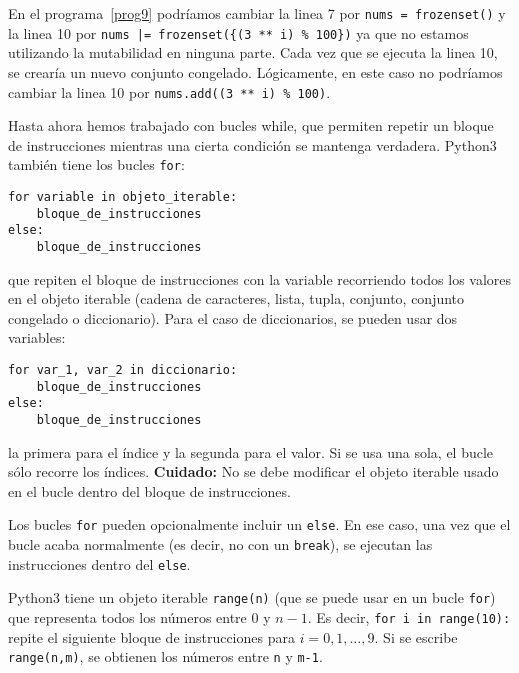 \documentclass[a4paper, 11pt]{article}
\theoremstyle{plain}
\theoremstyle{definition}
\begin{document}
\bigskip

En el programa~\ref{prog9} podríamos cambiar la linea 7 por
\texttt{nums = frozenset()} y la linea 10 por
\texttt{nums |= frozenset(\{(3 ** i) \% 100\})} ya que no estamos utilizando
la mutabilidad en ninguna parte.
Cada vez que se ejecuta la linea 10, se crearía un nuevo conjunto congelado.
Lógicamente, en este caso no podríamos cambiar la linea 10 por
\texttt{nums.add((3 ** i) \% 100)}.

\bigskip

Hasta ahora hemos trabajado con bucles while, que permiten repetir un
bloque de instrucciones mientras una cierta condición se mantenga verdadera.
Python3 también tiene los bucles \texttt{for}:

\begin{lstlisting}
for variable in objeto_iterable:
    bloque_de_instrucciones
else:
    bloque_de_instrucciones
\end{lstlisting}

que repiten el bloque de instrucciones con la variable recorriendo todos los
valores en el objeto iterable (cadena de caracteres, lista, tupla, conjunto,
conjunto congelado o diccionario). Para el caso de diccionarios, se pueden
usar dos variables:

\begin{lstlisting}
for var_1, var_2 in diccionario:
    bloque_de_instrucciones
else:
    bloque_de_instrucciones
\end{lstlisting}

la primera para el índice y la segunda para el valor. Si se usa una sola, el
bucle sólo recorre los índices. {\bf Cuidado:} No se debe modificar el objeto
iterable usado en el bucle dentro del bloque de instrucciones.

\bigskip

Los bucles \texttt{for} pueden opcionalmente incluir un \texttt{else}. En ese
caso, una vez que el bucle acaba normalmente (es decir, no con un \texttt{break}),
se ejecutan las instrucciones dentro del \texttt{else}.

\bigskip

Python3 tiene un objeto iterable \texttt{range(n)} (que se puede usar en un
bucle \texttt{for}) que representa todos los números entre $0$ y $n-1$. Es
decir, \texttt{for i in range(10):} repite el siguiente bloque de instrucciones
para $i=0,1,\ldots,9$. Si se escribe \texttt{range(n,m)}, se obtienen los
números entre \texttt{n} y \texttt{m-1}.

\bigskip
\end{document}
